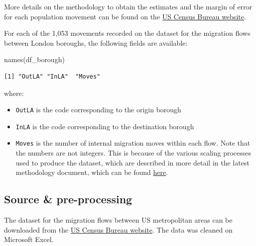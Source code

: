 \documentclass[
  letterpaper,
  DIV=11,
  numbers=noendperiod]{scrreprt}
\newenvironment{Shaded}{\begin{snugshade}}{\end{snugshade}}
\newcommand{\FunctionTok}[1]{\textcolor[rgb]{0.28,0.35,0.67}{#1}}
\newcommand{\NormalTok}[1]{\textcolor[rgb]{0.00,0.23,0.31}{#1}}
\providecommand{\tightlist}{%
  \setlength{\itemsep}{0pt}\setlength{\parskip}{0pt}}\usepackage{longtable,booktabs,array}
\begin{document}
More details on the methodology to obtain the estimates and the margin
of error for each population movement can be found on the
\href{https://www.census.gov/programs-surveys/acs/methodology.html}{US
Census Bureau website}.

For each of the 1,053 movements recorded on the dataset for the
migration flows between London boroughs, the following fields are
available:

\begin{Shaded}
\begin{Highlighting}[]
\FunctionTok{names}\NormalTok{(df\_borough)}
\end{Highlighting}
\end{Shaded}

\begin{verbatim}
[1] "OutLA" "InLA"  "Moves"
\end{verbatim}

where:

\begin{itemize}
\tightlist
\item
  \texttt{OutLA} is the code corresponding to the origin borough
\item
  \texttt{InLA} is the code corresponding to the destination borough
\item
  \texttt{Moves} is the number of internal migration moves within each
  flow. Note that the numbers are not integers. This is because of the
  various scaling processes used to produce the dataset, which are
  described in more detail in the latest methodology document, which can
  be found
  \href{https://www.ons.gov.uk/peoplepopulationandcommunity/populationandmigration/migrationwithintheuk/datasets/internalmigrationbyoriginanddestinationlocalauthoritiessexandsingleyearofagedetailedestimatesdataset}{here}.
\end{itemize}

\hypertarget{source-pre-processing-2}{%
\subsection*{Source \& pre-processing}\label{source-pre-processing-2}}

The dataset for the migration flows between US metropolitan areas can be
downloaded from the
\href{https://www.census.gov/data/tables/2019/demo/geographic-mobility/metro-to-metro-migration.html}{US
Census Bureau website}. The data was cleaned on Microsoft Excel.
\end{document}
